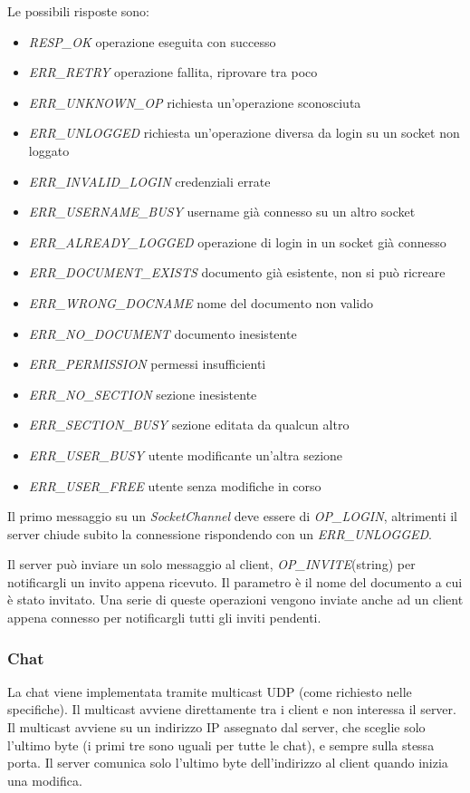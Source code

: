 \documentclass[a4paper]{article}
\theoremstyle{theorem}
\theoremstyle{remark}
\theoremstyle{definition}
\theoremstyle{corollary}
\theoremstyle{lemma}
\begin{document}
Le possibili risposte sono:
\begin{itemize}
	\item \textit{RESP\_OK} operazione eseguita con successo
	\item \textit{ERR\_RETRY} operazione fallita, riprovare tra poco
	\item \textit{ERR\_UNKNOWN\_OP} richiesta un'operazione sconosciuta
	\item \textit{ERR\_UNLOGGED} richiesta un'operazione diversa da login su un socket non loggato
	\item \textit{ERR\_INVALID\_LOGIN} credenziali errate
	\item \textit{ERR\_USERNAME\_BUSY} username già connesso su un altro socket
	\item \textit{ERR\_ALREADY\_LOGGED} operazione di login in un socket già connesso
	\item \textit{ERR\_DOCUMENT\_EXISTS} documento già esistente, non si può ricreare
	\item \textit{ERR\_WRONG\_DOCNAME} nome del documento non valido
	\item \textit{ERR\_NO\_DOCUMENT} documento inesistente
	\item \textit{ERR\_PERMISSION} permessi insufficienti
	\item \textit{ERR\_NO\_SECTION} sezione inesistente
	\item \textit{ERR\_SECTION\_BUSY} sezione editata da qualcun altro
	\item \textit{ERR\_USER\_BUSY} utente modificante un'altra sezione
	\item \textit{ERR\_USER\_FREE} utente senza modifiche in corso
\end{itemize}

Il primo messaggio su un \textit{SocketChannel} deve essere di \textit{OP\_LOGIN}, altrimenti il server chiude subito la connessione rispondendo con un \textit{ERR\_UNLOGGED}.

Il server può inviare un solo messaggio al client, \textit{OP\_INVITE}(string) per notificargli un invito appena ricevuto. Il parametro è il nome del documento a cui è stato invitato. Una serie di queste operazioni vengono inviate anche ad un client appena connesso per notificargli tutti gli inviti pendenti.

\subsubsection{Chat}
La chat viene implementata tramite multicast UDP (come richiesto nelle specifiche). Il multicast avviene direttamente tra i client e non interessa il server. Il multicast avviene su un indirizzo IP assegnato dal server, che sceglie solo l'ultimo byte (i primi tre sono uguali per tutte le chat), e sempre sulla stessa porta. Il server comunica solo l'ultimo byte dell'indirizzo al client quando inizia una modifica.
\end{document}
